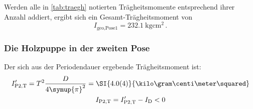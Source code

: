 Werden alle in \ref{tab:traegh} notierten Trägheitsmomente entsprechend ihrer Anzahl addiert, ergibt sich ein 
Gesamt-Trägheitsmoment von 
\begin{equation}
    I_\text{geo,Pose1}=\SI{232.1}{\kilo\gram\centi\meter\squared}\,.
\end{equation}


\FloatBarrier
\subsubsection{Die Holzpuppe in der zweiten Pose}

Der sich aus der Periodendauer ergebende Trägheitsmoment ist: 
\begin{gather}
    I'_\text{P2,T}=T^2\frac{D}{4\symup{\pi}^2}=\SI{4.0(4)}{\kilo\gram\centi\meter\squared} \\
    I_\text{P2,T}=I'_\text{P2,T}-I_\text{D} <0 
\end{gather}